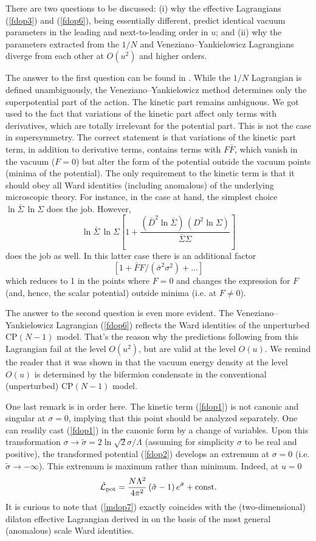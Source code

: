 \documentclass[epsfig,12pt]{article}
\def\beq{\begin{equation}}
\def\eeq{\end{equation}}
\def\beq{\begin{equation}}
\def\eeq{\end{equation}}
\begin{document}
{There are two questions to be discussed: (i) why the effective Lagrangians  (\ref{fdop3}) and (\ref{fdop6}),
 being essentially different, predict identical vacuum parameters in the leading and next-to-leading order in $u$;
 and (ii) why the  parameters extracted from the $1/N$ and Veneziano--Yankielowicz Lagrangians diverge 
 from each other at $O(u^2)$ and  higher orders.

The answer to the first question can be found in \cite{AdDVecSal}. While  the $1/N$ 
Lagrangian is defined unambiguously, the Veneziano--Yankielowicz method determines only the
superpotential part of the action. The kinetic part remains ambiguous. We got used to the fact that
variations of the kinetic part affect only terms with derivatives, which are totally irrelevant for the
potential part. This is not the case in supersymmetry.
The correct statement is that variations of the kinetic part term, in addition to derivative terms,
contains terms with $F\bar F$, which vanish in the vacuum ($F=0$) but alter the form of the potential outside
the vacuum points (minima of the potential). The only requirement to the kinetic term is that
it should obey all Ward identities (including anomalous) of the underlying microscopic theory.
For instance, in the case at hand, the simplest choice $\ln\bar\Sigma\, \ln \Sigma $
does the job. However, 
$$
\ln\bar\Sigma\, \ln \Sigma \left[1+ \frac{(\bar{D}^2 \ln\bar\Sigma)\, ({D}^2\ln \Sigma )}{\bar\Sigma\Sigma }
\right]
$$
does the job as well. In this latter case there is an additional factor
$$
\left[1 +\bar FF/(\bar\sigma^2\sigma^2)   +...  \right] $$
which reduces to 1 in the points where $F=0$ and changes the expression for $F$ (and, hence, the scalar potential)
outside minima (i.e. at $F\neq 0$).

The answer to the second question is even more evident.
The Veneziano--Yan\-ki\-e\-lo\-wicz Lagrangian (\ref{fdop6}) reflects the Ward identities
of the unperturbed CP$(N-1)$ model. That's the reason why the predictions following from this
Lagrangian fail at the level $O(u^2)$, but are valid at the level $O(u)$. 
We remind the reader that it was shown in \cite{SY1} that the vacuum energy density
at the level $O(u)$ is determined by the bifermion condensate in the 
conventional (unperturbed) CP$(N-1)$ model.

One last remark is in order here.
The kinetic term (\ref{fdop1}) is not canonic and singular at $\sigma=0$, implying that this point should be analyzed separately.
One can readily cast (\ref{fdop1}) in the canonic form by a change of variables. Upon this transformation 
$\sigma\to \tilde 
\sigma =2 \ln\sqrt{2}\sigma/\Lambda$ (assuming for simplicity $\sigma$ to be real and positive),
the transformed potential (\ref{fdop2})    develops an extremum at 
$\sigma = 0$ (i.e. $\tilde\sigma \to -\infty$). This extremum is maximum rather than minimum.
Indeed, at $u=0$
\beq
\tilde{\mathcal L}_{\rm pot} = \frac{N\Lambda^2}{4\pi^2}\,(\tilde\sigma - 1)\,e^{\tilde\sigma}
+{\rm const}.
\label{mdop7}
\eeq
It is curious to note that (\ref{mdop7}) exactly coincides with the (two-dimensional)
dilaton effective Lagrangian derived in \cite{SMMS} on the basis of the most general
(anomalous) scale Ward identities.

}
\end{document}
